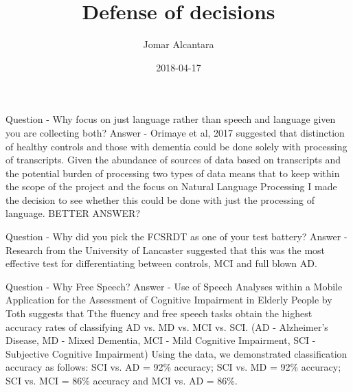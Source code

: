 \documentclass{article}
\title{Defense of decisions}
\date{2018-04-17}
\author{Jomar Alcantara}
\begin{document}
	Question - Why focus on just language rather than speech and language given you are collecting both?
	Answer - Orimaye et al, 2017 suggested that distinction of healthy controls and those with dementia could be done solely with processing of transcripts. Given the abundance of sources of data based on transcripts and the potential burden of processing two types of data means that to keep within the scope of the project and the focus on Natural Language Processing I made the decision to see whether this could be done with just the processing of language. BETTER ANSWER?
	
	Question - Why did you pick the FCSRDT as one of your test battery?
	Answer - Research from the University of Lancaster suggested that this was the most effective test for differentiating between controls, MCI and full blown AD.
	
	Question - Why Free Speech?
	Answer - Use of Speech Analyses within a Mobile Application for the Assessment of Cognitive Impairment in Elderly People by Toth suggests that Tthe fluency and free speech tasks obtain the highest accuracy rates of classifying AD vs. MD vs. MCI vs. SCI. (AD - Alzheimer's Disease, MD - Mixed Dementia, MCI - Mild Cognitive Impairment, SCI - Subjective Cognitive Impairment) Using the data, we demonstrated classification accuracy as follows: SCI vs. AD = 92\% accuracy; SCI vs. MD = 92\% accuracy; SCI vs. MCI = 86\% accuracy and MCI vs. AD = 86\%.
\end{document}
